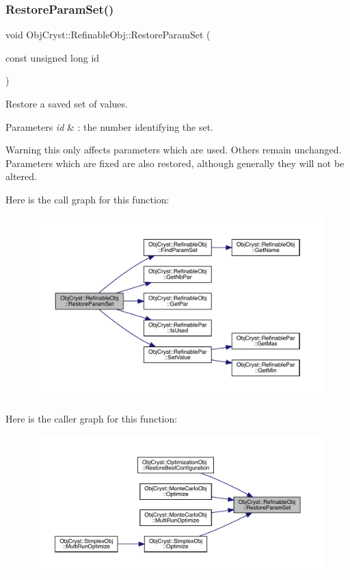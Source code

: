 \subsubsection{\texorpdfstring{RestoreParamSet()}{RestoreParamSet()}}
{\footnotesize\ttfamily void Obj\+Cryst\+::\+Refinable\+Obj\+::\+Restore\+Param\+Set (\begin{DoxyParamCaption}\item[{const unsigned long}]{id }\end{DoxyParamCaption})}



Restore a saved set of values. 


\begin{DoxyParams}{Parameters}
{\em id} & \+: the number identifying the set. \\
\hline
\end{DoxyParams}
\begin{DoxyWarning}{Warning}
this only affects parameters which are used. Others remain unchanged. Parameters which are fixed are also restored, although generally they will not be altered. 
\end{DoxyWarning}
Here is the call graph for this function\+:
\nopagebreak
\begin{figure}[H]
\begin{center}
\leavevmode
\includegraphics[width=350pt]{class_obj_cryst_1_1_refinable_obj_a057437fe6759b589906d8a16f9732e22_cgraph}
\end{center}
\end{figure}
Here is the caller graph for this function\+:
\nopagebreak
\begin{figure}[H]
\begin{center}
\leavevmode
\includegraphics[width=350pt]{class_obj_cryst_1_1_refinable_obj_a057437fe6759b589906d8a16f9732e22_icgraph}
\end{center}
\end{figure}
